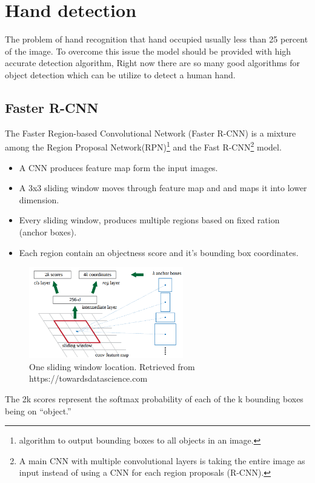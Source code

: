 \documentclass[12pt]{report}
\begin{document}
\clearpage

\section{Hand detection}

The problem of hand recognition that hand occupied usually less than 25 percent of the image.
To overcome this issue the model should be provided with high accurate detection algorithm,
Right now there are so many good algorithms for object detection which can be utilize to 
detect a human hand.

\subsection{Faster R-CNN}

The Faster Region-based Convolutional Network (Faster R-CNN) is a  mixture among  
the Region Proposal Network(RPN)\footnote{algorithm to output bounding boxes to all objects in an image.} 
and the Fast R-CNN\footnote{A main CNN with multiple convolutional layers is taking the entire image as input instead of using a CNN for each region proposals (R-CNN).} model.
\begin{itemize}
    \item A CNN produces feature map form the input images.
    \item A 3x3 sliding window moves through feature map and and maps it into lower dimension.
    \item Every sliding window, produces multiple regions based on fixed ration (anchor boxes).
    \item Each region contain an objectness score and it's bounding box coordinates.
\end{itemize}
\begin{figure}[h]
    \centering
    \includegraphics[width=0.6\textwidth]{./images/cfm.png}
    \caption{One sliding window location. Retrieved from https://towardsdatascience.com}
    \label{fig:frcnn}
\end{figure} 
The 2k scores represent the softmax probability of each of the k bounding boxes being on “object.”
\end{document}
